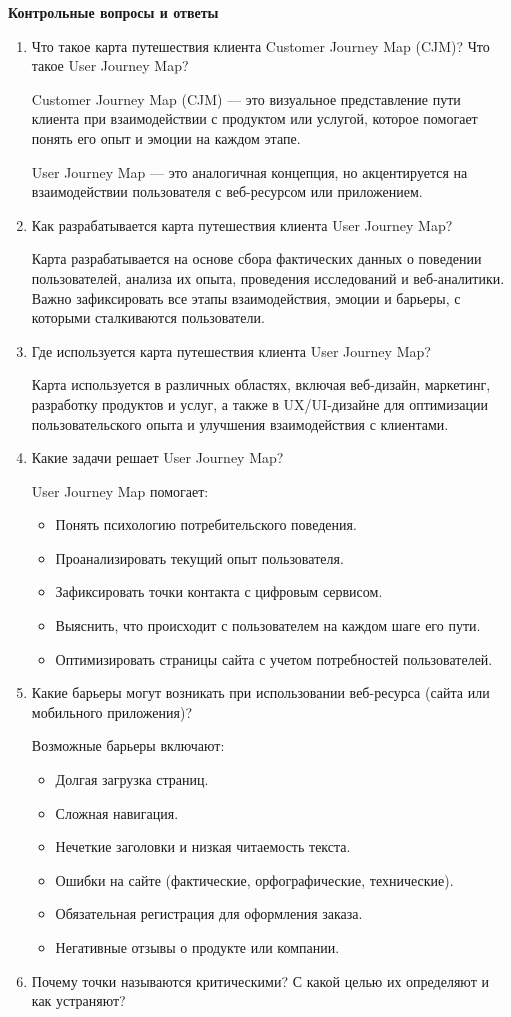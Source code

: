 \textbf{Контрольные вопросы и ответы}

\begin{enumerate}
    \item Что такое карта путешествия клиента Customer Journey Map (CJM)? Что такое User Journey Map?

Customer Journey Map (CJM) — это визуальное представление пути клиента при взаимодействии с продуктом или услугой, которое помогает понять его опыт и эмоции на каждом этапе.

        User Journey Map — это аналогичная концепция, но акцентируется на взаимодействии пользователя с веб-ресурсом или приложением.
    \item Как разрабатывается карта путешествия клиента User Journey Map?

Карта разрабатывается на основе сбора фактических данных о поведении пользователей, анализа их опыта, проведения исследований и веб-аналитики. Важно зафиксировать все этапы взаимодействия, эмоции и барьеры, с которыми сталкиваются пользователи.
    \item Где используется карта путешествия клиента User Journey Map?

Карта используется в различных областях, включая веб-дизайн, маркетинг, разработку продуктов и услуг, а также в UX/UI-дизайне для оптимизации пользовательского опыта и улучшения взаимодействия с клиентами.
    \item Какие задачи решает User Journey Map?

User Journey Map помогает:
        \begin{itemize}
            \item Понять психологию потребительского поведения.
            \item Проанализировать текущий опыт пользователя.
            \item Зафиксировать точки контакта с цифровым сервисом.
            \item Выяснить, что происходит с пользователем на каждом шаге его пути.
            \item Оптимизировать страницы сайта с учетом потребностей пользователей.
        \end{itemize}
    \item Какие барьеры могут возникать при использовании веб-ресурса (сайта или мобильного приложения)?

Возможные барьеры включают:
        \begin{itemize}
            \item Долгая загрузка страниц.
            \item Сложная навигация.
            \item Нечеткие заголовки и низкая читаемость текста.
            \item Ошибки на сайте (фактические, орфографические, технические).
            \item Обязательная регистрация для оформления заказа.
            \item Негативные отзывы о продукте или компании.
        \end{itemize}
\item Почему точки называются критическими? С какой целью их определяют и как устраняют?


\end{enumerate}

